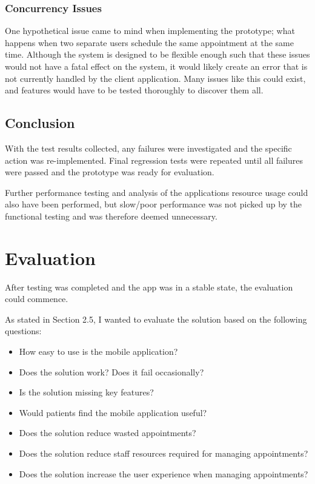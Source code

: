 \subsubsection{Concurrency Issues}

One hypothetical issue came to mind when implementing the prototype; what happens when two separate users schedule the same appointment at the same time. Although the system is designed to be flexible enough such that these issues would not have a fatal effect on the system, it would likely create an error that is not currently handled by the client application. Many issues like this could exist, and features would have to be tested thoroughly to discover them all.

\subsection{Conclusion}

With the test results collected, any failures were investigated and the specific action was re-implemented. Final regression tests were repeated until all failures were passed and the prototype was ready for evaluation.

Further performance testing and analysis of the applications resource usage could also have been performed, but slow/poor performance was not picked up by the functional testing and was therefore deemed unnecessary.


\section{Evaluation}

After testing was completed and the app was in a stable state, the evaluation could commence.

As stated in Section 2.5, I wanted to evaluate the solution based on the following questions:

\begin{itemize}
	\item How easy to use is the mobile application?
	\item Does the solution work? Does it fail occasionally?
	\item Is the solution missing key features?
	\item Would patients find the mobile application useful?
	\item Does the solution reduce wasted appointments?
	\item Does the solution reduce staff resources required for managing appointments?
	\item Does the solution increase the user experience when managing appointments?
\end{itemize}

